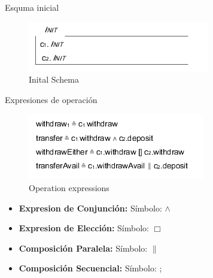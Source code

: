 \documentclass{beamer}
\begin{document}
\begin{frame}{Esquma inicial}
  \begin{figure}
      \centering
      \includegraphics[scale=0.5]{Z9.png}
      \caption{Inital Schema}
      \label{Esquema Inicial}
  \end{figure}
\end{frame}

\begin{frame}{Expresiones de operación}
 \begin{figure}
      \centering
      \includegraphics[scale=0.5]{Z10.png}
      \caption{Operation expressions}
      \label{Esquema Inicial}
  \end{figure}
  \begin{itemize}
   \item \textbf{Expresion de Conjunción: } Símbolo: $\wedge$
   \item \textbf{Expresion de Elección:} Símbolo: $\Box$
   \item \textbf{Composición Paralela:} Símbolo: $\parallel$
   \item \textbf{Composición Secuencial:} Símbolo: ;
  \end{itemize}
\end{frame}
\end{document}
